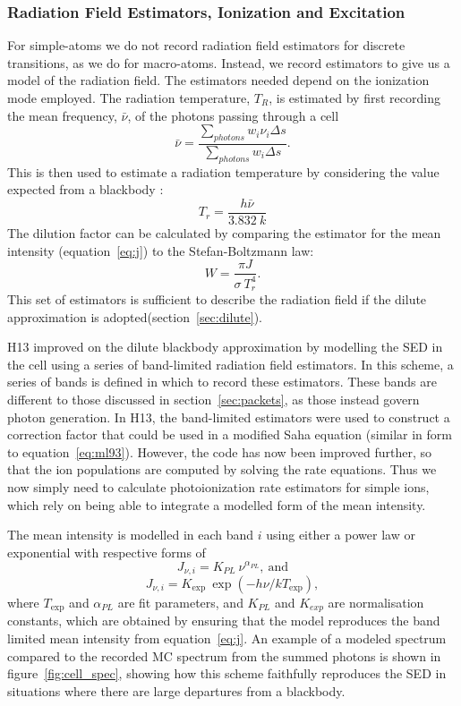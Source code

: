 \subsubsection{Radiation Field Estimators, Ionization and Excitation}
\label{sec:simple_ionization}
For simple-atoms we do not record radiation field estimators for discrete 
transitions, as we do for macro-atoms. Instead, we record estimators to
give us a model of the radiation field. The estimators needed
depend on the ionization mode employed.
The radiation temperature, $T_R$, is estimated by first recording the mean frequency, 
$\bar{\nu}$, of the photons passing through a cell
\begin{equation}
\bar{\nu} = \frac{\sum_{photons} w_i \nu_i \Delta s}{\sum_{photons} w_i \Delta s}.
\end{equation}
This is then used to estimate a radiation temperature by
considering the value expected from a blackbody \citep{ML93}:
\begin{equation}
T_r = \frac{h\bar{\nu}}{3.832~k}
\end{equation}
The dilution factor can be calculated by comparing the estimator for the mean intensity (equation~\ref{eq:j}) to the Stefan-Boltzmann law:
\begin{equation}
W = \frac{\pi J}{\sigma~T_r^4}.
\end{equation}
This set of estimators is sufficient to describe the 
radiation field if the dilute approximation is adopted(section~\ref{sec:dilute}).

H13 improved on the dilute blackbody approximation by
modelling the SED in the cell using a series of band-limited 
radiation field estimators. In this scheme, a series of bands is defined
in which to record these estimators. These bands are different to those
discussed in section~\ref{sec:packets}, as those instead govern photon generation.
In H13, the band-limited estimators were used to construct a correction factor
that could be used in a modified Saha equation 
(similar in form to equation~\ref{eq:ml93}). However, the code has now been
improved further, so that the ion populations are computed by solving the rate equations.
Thus we now simply need to calculate photoionization rate estimators for simple 
ions, which rely on being able to integrate a modelled form of the mean intensity.

The mean intensity is modelled in each band $i$ using either a power law or exponential
with respective forms of
\begin{equation}
J_{\nu,i} = K_{PL}~ \nu^{\alpha_{PL}},~\mathrm{and}
\end{equation}
\begin{equation}
J_{\nu,i} = K_{\exp}~ \exp(-h\nu / k T_{\exp}),
\end{equation}
where $T_{\exp}$ and $\alpha_{PL}$ are fit parameters, and $K_{PL}$ and $K_{exp}$ 
are normalisation constants, which are obtained by ensuring that
the model reproduces the band limited mean intensity from equation~\ref{eq:j}.
An example of a modeled spectrum compared to the recorded MC spectrum from
the summed photons is shown in figure~\ref{fig:cell_spec}, showing how
this scheme faithfully reproduces the SED in situations where there are large departures
from a blackbody. 

